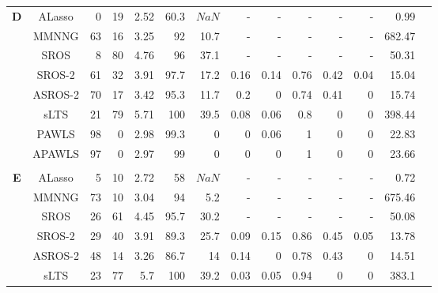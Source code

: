 \documentclass{article}\usepackage[]{graphicx}\usepackage[]{color}
\begin{document}
\begin{table}[thp]
\begin{center}
\begin{tabular}{ccrrrrrrrrrrrr}
	     \\
	       	  \multirow{8}{*}{{\bf D}}
	      & ALasso & 0 & 19 & 2.52 & 
	      60.3 & \ensuremath{NaN} & - & - & - & - & - & 0.99\\
	
	      & MMNNG & 63 & 16 & 3.25 & 
	      92 & 10.7 & - & - & - & - & - & 682.47\\
	      
	      & SROS & 8 & 80 & 4.76 & 
	      96 & 37.1 & - & - & - & - & - & 50.31\\
	      
	      & SROS-2 & 61 & 32 & 3.91 & 
	      97.7 & 17.2 &
	      0.16 & 0.14 & 0.76
	      & 0.42 & 0.04 & 15.04\\
	      
	     & ASROS-2 & 70 & 17 & 3.42 & 
	      95.3 & 11.7 &
	      0.2 & 0 & 0.74
	      & 0.41 & 0 & 15.74\\
	      
	       & sLTS & 21 & 79 & 5.71 & 
	      100 & 39.5 &
	      0.08 & 0.06 & 0.8
	      & 0 & 0 & 398.44\\
	      
	      & PAWLS & 98 & 0 & 2.98 & 
	      99.3 & 0 &
	      0 & 0.06 & 1
	      & 0 & 0 & 22.83\\
	      
	      & APAWLS & 97 & 0 & 2.97 & 
	      99 & 0 &
	      0 & 0 & 1
	      & 0 & 0 & 23.66\\
	      
	      \\
	       	  \multirow{8}{*}{{\bf E}}
	      & ALasso & 5 & 10 & 2.72 & 
	      58 & \ensuremath{NaN} & - & - & - & - & - & 0.72\\
	
	      & MMNNG & 73 & 10 & 3.04 & 
	      94 & 5.2 & - & - & - & - & - & 675.46\\
	      
	      & SROS & 26 & 61 & 4.45 & 
	      95.7 & 30.2 & - & - & - & - & - & 50.08\\
	      
	      & SROS-2 & 29 & 40 & 3.91 & 
	      89.3 & 25.7 &
	      0.09 & 0.15 & 0.86
	      & 0.45 & 0.05 & 13.78\\
	      
	     & ASROS-2 & 48 & 14 & 3.26 & 
	      86.7 & 14 &
	      0.14 & 0 & 0.78
	      & 0.43 & 0 & 14.51\\
	      
	       & sLTS & 23 & 77 & 5.7 & 
	      100 & 39.2 &
	      0.03 & 0.05 & 0.94
	      & 0 & 0 & 383.1\\
	      

\end{tabular}
\end{center}
\end{table}
\end{document}
